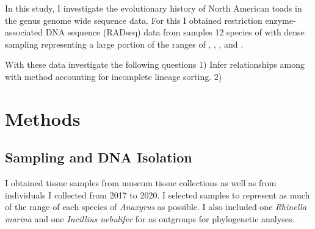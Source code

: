 In this study, I investigate the evolutionary history of North American
toads in the genus \anaxyrus genome wide sequence data. 
For this I obtained restriction enzyme-associated DNA sequence (RADseq) data
from samples 12 species of \anaxyrus with dense sampling representing a 
large portion of the ranges of \amer, \fowler, \terr, and \woodhousii.


With these data investigate the following questions
1) Infer relationships among \anaxyrus with method accounting for incomplete 
lineage sorting.
2) 










\section{Methods}
\subsection{Sampling and DNA Isolation}
I obtained tissue samples from museum tissue collections as well as from individuals   
I collected from 2017 to 2020. I selected samples to represent as much
of the range of each species of \textit{Anaxyrus} as possible.
I also included one \textit{Rhinella marina} and one \textit{Incillius nebulifer} 
for as outgroups for phylogenetic analyses.

